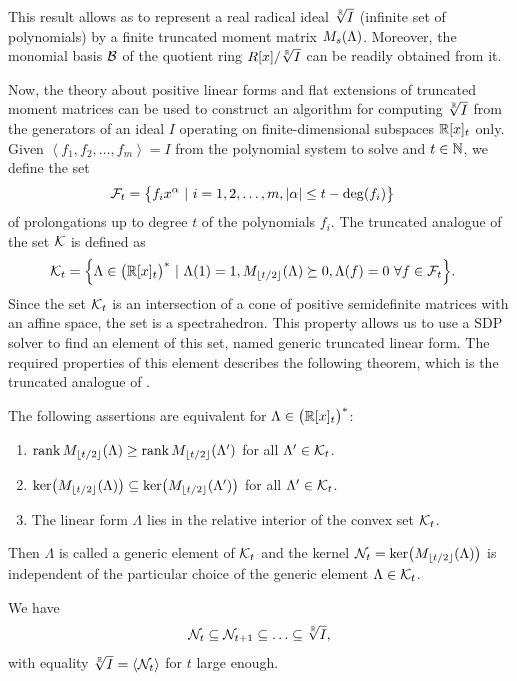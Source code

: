 This result allows as to represent a real radical ideal $\sqrt[\mathbb{R}]{I}$ (infinite set of polynomials) by a finite truncated moment matrix $M_s(\Lambda)$.
Moreover, the monomial basis $\mathcal{B}$ of the quotient ring $R[x]/\sqrt[\mathbb{R}]{I}$ can be readily obtained from it.

Now, the theory about positive linear forms and flat extensions of truncated moment matrices can be used to construct an algorithm for computing $\sqrt[\mathbb{R}]{I}$ from the generators of an ideal $I$ operating on finite-dimensional subspaces $\mathbb{R}[x]_t$ only.
Given $\left<f_1, f_2, \ldots, f_m\right> = I$ from the polynomial system  to solve and $t\in\mathbb{N}$, we define the set
\begin{align}
  \mathcal{F}_t &= \big\{f_ix^\alpha\ |\ i = 1, 2, \ldots, m, |\alpha|\leq t-\deg(f_i)\big\}
\end{align}
of prolongations up to degree $t$ of the polynomials $f_i$.
The truncated analogue of the set $\mathcal{K}$ is defined as
\begin{align}
  \mathcal{K}_t &= \Big\{\Lambda\in\big(\mathbb{R}[x]_{t}\big)^*\ |\ \Lambda(1) = 1, M_{\lfloor t/2\rfloor}(\Lambda) \succeq 0, \Lambda(f) = 0 \ \forall f\in\mathcal{F}_t\Big\}.
\end{align}
Since the set $\mathcal{K}_t$ is an intersection of a cone of positive semidefinite matrices with an affine space, the set is a spectrahedron.
This property allows us to use a SDP solver to find an element of this set, named generic truncated linear form.
The required properties of this element describes the following theorem, which is the truncated analogue of .

\begin{theorem}
  The following assertions are equivalent for $\Lambda\in\big(\mathbb{R}[x]_{t}\big)^*$:
  \begin{enumerate}
    \item $\operatorname{rank}M_{\lfloor t/2\rfloor}(\Lambda) \geq \operatorname{rank} M_{\lfloor t/2\rfloor}(\Lambda')$ for all $\Lambda'\in\mathcal{K}_t$.
    \item $\operatorname{ker}\!\big(M_{\lfloor t/2\rfloor}(\Lambda)\big) \subseteq \operatorname{ker}\!\big(M_{\lfloor t/2\rfloor}(\Lambda')\big)$ for all $\Lambda'\in\mathcal{K}_t$.
    \item The linear form $\Lambda$ lies in the relative interior of the convex set $\mathcal{K}_t$.
  \end{enumerate}
  Then $\Lambda$ is called a generic element of $\mathcal{K}_t$ and the kernel $\mathcal{N}_t = \operatorname{ker}\!\big(M_{\lfloor t/2\rfloor}(\Lambda)\big)$ is independent of the particular choice of the generic element $\Lambda\in\mathcal{K}_t$.
\end{theorem}

\begin{theorem}
  We have
  \begin{align}
    \mathcal{N}_t \subseteq \mathcal{N}_{t+1} \subseteq \ldots \subseteq \sqrt[\mathbb{R}]{I},
  \end{align}
  with equality $\sqrt[\mathbb{R}]{I} = \left<\mathcal{N}_t\right>$ for $t$ large enough.
\end{theorem}

